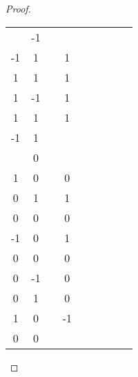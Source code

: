 \begin{proof}
\begin{tabular}{c|c|c|c|c|c|c|c|c}
\begin{matrix}
				1  & -1 \\
				-1 & 1
			\end{matrix}\)
		 &
		\( \begin{matrix}
				1 & 1 \\
				1 & 1
			\end{matrix}\)
		 &
		\( \begin{matrix}
				1 & 1  \\
				1 & -1
			\end{matrix}\)
		 &
		\( \begin{matrix}
				-1 & 1 \\
				1  & 1
			\end{matrix}\)
		 &
		\( \begin{matrix}
				1  & 1 \\
				-1 & 1
			\end{matrix}\) \\
		\hline
		\( \begin{matrix}
				1 & 0 \\
				1 & 0
			\end{matrix}\)
		 &
		\( \begin{matrix}
				1 & 0 \\
				0 & 1
			\end{matrix}\)
		 &
		\( \begin{matrix}
				1 & 1 \\
				0 & 0
			\end{matrix}\)
		 &
		\( \begin{matrix}
				1  & 0 \\
				-1 & 0
			\end{matrix}\)
		 &
		\( \begin{matrix}
				1 & 1 \\
				0 & 0
			\end{matrix}\)
		 &
		\( \begin{matrix}
				1 & 0  \\
				0 & -1
			\end{matrix}\)
		 &
		\( \begin{matrix}
				1 & 0 \\
				0 & 1
			\end{matrix}\)
		 &
		\( \begin{matrix}
				1 & 0 \\
				1 & 0
			\end{matrix}\)
		 &
		\( \begin{matrix}
				1 & -1 \\
				0 & 0
			\end{matrix}\) \\

\end{tabular}
\end{proof}
